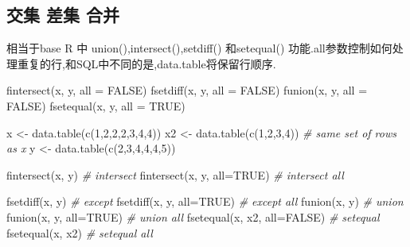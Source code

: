 \documentclass[
]{book}
\newenvironment{Shaded}{\begin{snugshade}}{\end{snugshade}}
\newcommand{\AttributeTok}[1]{\textcolor[rgb]{0.77,0.63,0.00}{#1}}
\newcommand{\CommentTok}[1]{\textcolor[rgb]{0.56,0.35,0.01}{\textit{#1}}}
\newcommand{\ConstantTok}[1]{\textcolor[rgb]{0.00,0.00,0.00}{#1}}
\newcommand{\DecValTok}[1]{\textcolor[rgb]{0.00,0.00,0.81}{#1}}
\newcommand{\FunctionTok}[1]{\textcolor[rgb]{0.00,0.00,0.00}{#1}}
\newcommand{\NormalTok}[1]{#1}
\newcommand{\OtherTok}[1]{\textcolor[rgb]{0.56,0.35,0.01}{#1}}
\begin{document}
\hypertarget{ux4ea4ux96c6-ux5deeux96c6-ux5408ux5e76}{%
\subsection{交集 差集 合并}\label{ux4ea4ux96c6-ux5deeux96c6-ux5408ux5e76}}

相当于base R 中 union(),intersect(),setdiff() 和setequal() 功能.all参数控制如何处理重复的行,和SQL中不同的是,data.table将保留行顺序.

\begin{Shaded}
\begin{Highlighting}[]

\FunctionTok{fintersect}\NormalTok{(x, y, }\AttributeTok{all =} \ConstantTok{FALSE}\NormalTok{)}
\FunctionTok{fsetdiff}\NormalTok{(x, y, }\AttributeTok{all =} \ConstantTok{FALSE}\NormalTok{)}
\FunctionTok{funion}\NormalTok{(x, y, }\AttributeTok{all =} \ConstantTok{FALSE}\NormalTok{)}
\FunctionTok{fsetequal}\NormalTok{(x, y, }\AttributeTok{all =} \ConstantTok{TRUE}\NormalTok{)}

\NormalTok{x }\OtherTok{\textless{}{-}}  \FunctionTok{data.table}\NormalTok{(}\FunctionTok{c}\NormalTok{(}\DecValTok{1}\NormalTok{,}\DecValTok{2}\NormalTok{,}\DecValTok{2}\NormalTok{,}\DecValTok{2}\NormalTok{,}\DecValTok{3}\NormalTok{,}\DecValTok{4}\NormalTok{,}\DecValTok{4}\NormalTok{))}
\NormalTok{x2 }\OtherTok{\textless{}{-}}  \FunctionTok{data.table}\NormalTok{(}\FunctionTok{c}\NormalTok{(}\DecValTok{1}\NormalTok{,}\DecValTok{2}\NormalTok{,}\DecValTok{3}\NormalTok{,}\DecValTok{4}\NormalTok{)) }\CommentTok{\# same set of rows as x}
\NormalTok{y }\OtherTok{\textless{}{-}}  \FunctionTok{data.table}\NormalTok{(}\FunctionTok{c}\NormalTok{(}\DecValTok{2}\NormalTok{,}\DecValTok{3}\NormalTok{,}\DecValTok{4}\NormalTok{,}\DecValTok{4}\NormalTok{,}\DecValTok{4}\NormalTok{,}\DecValTok{5}\NormalTok{))}

\FunctionTok{fintersect}\NormalTok{(x, y)            }\CommentTok{\# intersect}
\FunctionTok{fintersect}\NormalTok{(x, y, }\AttributeTok{all=}\ConstantTok{TRUE}\NormalTok{)  }\CommentTok{\# intersect all}

\FunctionTok{fsetdiff}\NormalTok{(x, y)              }\CommentTok{\# except}
\FunctionTok{fsetdiff}\NormalTok{(x, y, }\AttributeTok{all=}\ConstantTok{TRUE}\NormalTok{)    }\CommentTok{\# except all}
\FunctionTok{funion}\NormalTok{(x, y)                }\CommentTok{\# union}
\FunctionTok{funion}\NormalTok{(x, y, }\AttributeTok{all=}\ConstantTok{TRUE}\NormalTok{)      }\CommentTok{\# union all}
\FunctionTok{fsetequal}\NormalTok{(x, x2, }\AttributeTok{all=}\ConstantTok{FALSE}\NormalTok{) }\CommentTok{\# setequal}
\FunctionTok{fsetequal}\NormalTok{(x, x2)            }\CommentTok{\# setequal all}
\end{Highlighting}
\end{Shaded}
\end{document}
